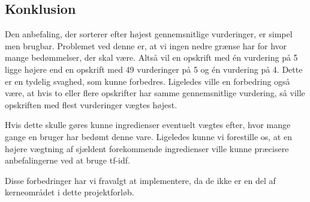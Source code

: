 \subsection{Konklusion}
Den anbefaling, der sorterer efter højest gennemsnitlige vurderinger, er simpel men brugbar.
Problemet ved denne er, at vi ingen nedre grænse har for hvor mange bedømmelser, der skal være.
Altså vil en opskrift med én vurdering på 5 ligge højere end en opskrift med 49 vurderinger på 5 og én vurdering på 4.
Dette er en tydelig svaghed, som kunne forbedres.
Ligeledes ville en forbedring også være, at hvis to eller flere opskrifter har samme gennemsnitlige vurdering, så ville opskriften med flest vurderinger vægtes højest.

Hvis dette skulle gøres kunne ingredienser eventuelt vægtes efter, hvor mange gange en bruger har bedømt denne vare.
Ligeledes kunne vi forestille os, at en højere vægtning af sjældent forekommende ingredienser ville kunne præcisere anbefalingerne ved at bruge tf-idf.

Disse forbedringer har vi fravalgt at implementere, da de ikke er en del af kerneområdet i dette projektforløb.
